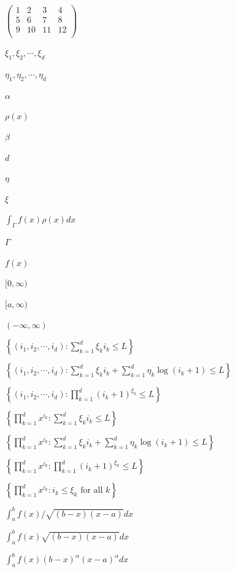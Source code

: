 \documentclass{article}
\begin{document}
$ \left( \begin{array}{rrrr} 1 & 2 & 3 & 4 \\ 5 & 6 & 7 & 8 \\ 9 & 10 & 11 & 12 \\ \end{array} \right) $
\pagebreak

$ \xi_1, \xi_2, \cdots, \xi_d $
\pagebreak

$ \eta_1, \eta_2, \cdots, \eta_d $
\pagebreak

$ \alpha $
\pagebreak

$ \rho(x) $
\pagebreak

$ \beta $
\pagebreak

$ d $
\pagebreak

$ \eta $
\pagebreak

$ \xi $
\pagebreak

$ \int_\Gamma f(x) \rho(x) dx $
\pagebreak

$ \Gamma $
\pagebreak

$ f(x) $
\pagebreak

$ [0, \infty) $
\pagebreak

$ [a, \infty) $
\pagebreak

$ (-\infty, \infty) $
\pagebreak

$ \left\{ (i_1, i_2, \cdots, i_d) : \sum_{k=1}^d \xi_k i_k \leq L \right\} $
\pagebreak

$ \left\{ (i_1, i_2, \cdots, i_d) : \sum_{k=1}^d \xi_k i_k + \sum_{k=1}^d \eta_k \log(i_k + 1) \leq L \right\} $
\pagebreak

$ \left\{ (i_1, i_2, \cdots, i_d) : \prod_{k=1}^d (i_k + 1)^{\xi_k} \leq L \right\} $
\pagebreak

$ \left\{ \prod_{k=1}^d x^{i_k} : \sum_{k=1}^d \xi_k i_k \leq L \right\} $
\pagebreak

$ \left\{ \prod_{k=1}^d x^{i_k} : \sum_{k=1}^d \xi_k i_k + \sum_{k=1}^d \eta_k \log(i_k + 1) \leq L \right\} $
\pagebreak

$ \left\{ \prod_{k=1}^d x^{i_k} : \prod_{k=1}^d (i_k + 1)^{\xi_k} \leq L \right\} $
\pagebreak

$ \left\{ \prod_{k=1}^d x^{i_k} : i_k \leq \xi_k \mbox{ for all } k \right\} $
\pagebreak

$ \int_{a}^{b} f(x) / \sqrt{(b - x)(x - a)} dx $
\pagebreak

$ \int_{a}^{b} f(x) \sqrt{(b - x)(x - a)} dx $
\pagebreak

$ \int_{a}^{b} f(x) (b - x)^\alpha (x - a)^\alpha dx $
\pagebreak
\end{document}
